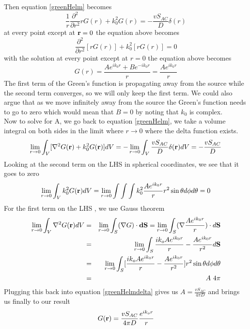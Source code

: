 Then equation \ref{greenHelm} becomes
\begin{equation}
\label{greenHelmLaplace}
\frac{1}{r}\frac{\partial^2}{\partial r^2}rG(r) + k_0^2G(r) 
=-\frac{vS_{AC}}{D}\delta(r)
\end{equation}
\noindent
at every point except at ${\bf r} = 0$ the equation above becomes 
\begin{equation}
\label{greenHelmLaplaceHomog}
\frac{\partial^2}{\partial r^2}[rG(r)] + k_0^2[rG(r)] = 0
\end{equation}
\noindent
with the solution at every point except at $r = 0$ the equation above becomes 
\begin{equation}
\label{greenHelmLaplaceSoln1}
G(r) = \frac{A e^{ik_0r} + B e^{-ik_0r}}{r} = \frac{A e^{ik_0r}}{r}
\end{equation}
The first term of the Green's function is propagating away from the source while the second term converges, so we will only keep the first
term. We could also argue that as we move infinitely away from the source the Green's function needs to go to zero which would mean that $B=0$ by noting that $k_0$ is complex. \\
Now to solve for A, we go back to equation \ref{greenHelm}, we take a volume integral on both sides in the limit where $r \rightarrow 0$ where the delta function exists.
\begin{equation}
\label{greenHelmdelta}
\lim_{r\rightarrow 0}\int_V[\nabla^2G({\bf r})+k_0^2G({\bf r})]dV =
-\lim_{r\rightarrow 0}\int_V \frac{vS_{AC}}{D}\delta({\bf r})dV =-\frac{vS_{AC}}{D}
\end{equation}
\noindent
Looking at the second term on the LHS in spherical coordinates, we see that it goes to zero
\begin{equation}
\label{greenHelm2nd}
\lim_{r\rightarrow 0}\int_Vk_0^2G({\bf r})dV = \lim_{r\rightarrow
  0}\int\int\int k_0^2\frac{A e^{ik_0r}}{r} r^2\sin\theta d\phi d\theta=0
\end{equation}
For the first term on the LHS , we use Gauss theorem
\begin{eqnarray}
\label{greenHelm1st}
  \lim_{r\rightarrow 0}\int_V\nabla^2G({\bf
    r})dV&=&\lim_{r\rightarrow 0} \int_S (\nabla G) \cdot {\bf dS} =
  \lim_{r\rightarrow 0} \int_S(\nabla\frac{A e^{ik_0r}}{r}) \cdot
  d{\bf S}\nonumber\\  
  &=&\lim_{r\rightarrow 0}\int_S\frac{ik_o A e^{ik_0r}}{r}-\frac{A
    e^{ik_0r}}{r^2}d{\bf S}\nonumber\\
  &=&\lim_{r\rightarrow 0}\int_S[\frac{ik_o A e^{ik_0r}}{r}-\frac{A
    e^{ik_0r}}{r^2}]r^2\sin\theta d\phi d\theta\nonumber\\
  &=&A\ 4\pi
\end{eqnarray}
\noindent
Plugging this back into equation \ref{greenHelmdelta} gives us $A = \frac{vS_{AC}}{4\pi D}$ and brings us finally to our result
\begin{equation}
\label{InfiniteSoln1}
G({\bf r}) = \frac{vS_{AC}}{4\pi D}\frac{e^{ik_or}}{r}
\end{equation}
